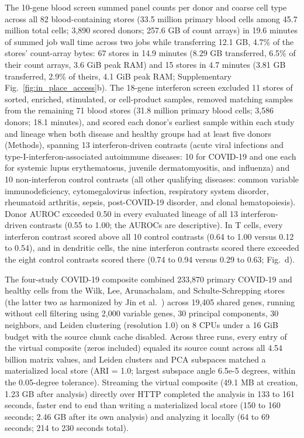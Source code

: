 \label{note:Blood archive interferon screen}

The 10-gene blood screen summed panel counts per donor and coarse cell type across all 82 blood-containing stores (33.5 million primary blood cells among 45.7 million total cells; 3,890 scored donors; 257.6 GB of count arrays) in 19.6 minutes of summed job wall time across two jobs while transferring 12.1 GB, 4.7\% of the stores' count-array bytes: 67 stores in 14.9 minutes (8.29 GB transferred, 6.5\% of their count arrays, 3.6 GiB peak RAM) and 15 stores in 4.7 minutes (3.81 GB transferred, 2.9\% of theirs, 4.1 GiB peak RAM; Supplementary Fig.~\ref{fig:in_place_access}b). The 18-gene interferon screen excluded 11 stores of sorted, enriched, stimulated, or cell-product samples, removed matching samples from the remaining 71 blood stores (31.8 million primary blood cells; 3,586 donors; 18.1 minutes), and scored each donor's earliest sample within each study and lineage when both disease and healthy groups had at least five donors (Methods), spanning 13 interferon-driven contrasts (acute viral infections and type-I-interferon-associated autoimmune diseases: 10 for COVID-19 and one each for systemic lupus erythematosus, juvenile dermatomyositis, and influenza) and 10 non-interferon control contrasts (all other qualifying diseases: common variable immunodeficiency, cytomegalovirus infection, respiratory system disorder, rheumatoid arthritis, sepsis, post-COVID-19 disorder, and clonal hematopoiesis). Donor AUROC exceeded 0.50 in every evaluated lineage of all 13 interferon-driven contrasts (0.55 to 1.00; the AUROCs are descriptive). In T cells, every interferon contrast scored above all 10 control contrasts (0.64 to 1.00 versus 0.12 to 0.54), and in dendritic cells, the nine interferon contrasts scored there exceeded the eight control contrasts scored there (0.74 to 0.94 versus 0.29 to 0.63; Fig.~d).

\label{note:Virtual composites and baselines}

The four-study COVID-19 composite combined 233,870 primary COVID-19 and healthy cells from the Wilk, Lee, Arunachalam, and Schulte-Schrepping stores~\cite{wilk2020singlecell,lee2020immunophenotyping,arunachalam2020systems,schulteschrepping2020severe} (the latter two as harmonized by Jin et al.~\cite{jin2021interactive}) across 19,405 shared genes, running without cell filtering using 2,000 variable genes, 30 principal components, 30 neighbors, and Leiden clustering (resolution 1.0) on 8 CPUs under a 16 GiB budget with the source chunk cache disabled. Across three runs, every entry of the virtual composite (zeros included) equaled its source count across all 4.54 billion matrix values, and Leiden clusters and PCA subspaces matched a materialized local store (ARI = 1.0; largest subspace angle 6.5e-5 degrees, within the 0.05-degree tolerance). Streaming the virtual composite (49.1 MB at creation, 1.23 GB after analysis) directly over HTTP completed the analysis in 133 to 161 seconds, faster end to end than writing a materialized local store (150 to 160 seconds; 2.46 GB after its own analysis) and analyzing it locally (64 to 69 seconds; 214 to 230 seconds total).

